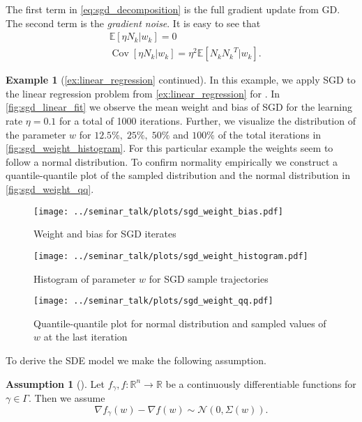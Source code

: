 \documentclass[12pt]{article}
\theoremstyle{definition}
\newtheorem{example}[example]{Example}
\newtheorem{assumption}[assumption]{Assumption}
\numberwithin{equation}{section}
\newcommand{\R}{\mathbb{R}}
\newcommand{\CN}{\mathcal{N}}
\newcommand{\ev}[1]{\mathbb{E}\left[{#1}\right]}
\DeclareMathOperator{\Cov}{Cov}
\begin{document}
The first term in \eqref{eq:sgd_decomposition} is the full gradient update from GD. The second term is the \emph{gradient noise}. It is easy to see that 
\begin{align*}
  &\ev{\eta N_k|w_{k}} = 0 \\
  &\Cov\left[\eta N_k|w_{k}\right] = \eta^2 \ev{N_k{N_k}^T|w_{k}}.
\end{align*}
\begin{example}[\autoref{ex:linear_regression} continued]
  In this example, we apply SGD to the linear regression problem from \autoref{ex:linear_regression} for . In \autoref{fig:sgd_linear_fit} we observe the mean weight and bias of SGD for the learning rate $\eta = 0.1$ for a total of 1000 iterations.
  Further, we visualize the distribution of the parameter $w$ for $12.5\%,\; 25\%,\; 50\%$ and $100\%$ of the total iterations in \autoref{fig:sgd_weight_histogram}. For this particular example the weights seem to follow a normal distribution. To confirm normality empirically we construct a quantile-quantile plot of the sampled distribution and the normal distribution in \autoref{fig:sgd_weight_qq}.
  \begin{figure}[htb]
    \centering
    \texttt{[image: ../seminar\_talk/plots/sgd\_weight\_bias.pdf]}
    \caption{Weight and bias for SGD iterates}
    \label{fig:sgd_linear_fit}
  \end{figure}
  \begin{figure}[htb]
    \centering
    \texttt{[image: ../seminar\_talk/plots/sgd\_weight\_histogram.pdf]}
    \caption{Histogram of parameter $w$ for SGD sample trajectories}
    \label{fig:sgd_weight_histogram}
  \end{figure}
  \begin{figure}[htb]
    \centering
    \texttt{[image: ../seminar\_talk/plots/sgd\_weight\_qq.pdf]}
    \caption{Quantile-quantile plot for normal distribution and sampled values of $w$ at the last iteration}
    \label{fig:sgd_weight_qq}
  \end{figure}
\end{example}
To derive the SDE model we make the following assumption.
\begin{assumption}[]
  \label{as:normality}
  Let $f_{\gamma}, f : \R^n \rightarrow \R$ be a continuously differentiable functions for $\gamma \in \Gamma$. Then we assume 
  \begin{equation*}
    \nabla f_{\gamma}(w) - \nabla f(w) \sim \CN(0, \Sigma(w)).
  \end{equation*}
\end{assumption}
\end{document}
